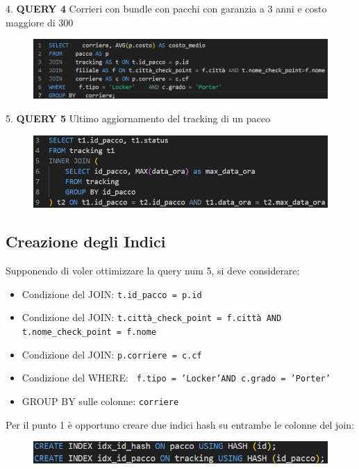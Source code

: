 4. \textbf{QUERY 4} Corrieri con bundle con pacchi con garanzia a 3 anni e costo maggiore di 300
\begin{figure}[H]
\centering
\includegraphics[width=0.8 \textwidth]{Resources/QUERY4.png}
\label{Q4}
\end{figure} 
5. \textbf{QUERY 5} Ultimo aggiornamento del tracking di un pacco
\begin{figure}[H]
\centering
\includegraphics[width=0.8 \textwidth]{Resources/QUERY5.png}
\label{Q5}
\end{figure}

\subsection{Creazione degli Indici} 

Supponendo di voler ottimizzare la query num 5, si deve considerare:

\begin{itemize}
  \item Condizione del JOIN: \texttt{t.id\_pacco = p.id}
  \item Condizione del JOIN: \texttt{t.città\_check\_point = f.città AND t.nome\_check\_point = f.nome}
  \item Condizione del JOIN: \texttt{p.corriere = c.cf}
  \item Condizione del WHERE: \texttt{ f.tipo = 'Locker'AND c.grado = 'Porter'}
  \item GROUP BY sulle colonne: \texttt{corriere}
\end{itemize}


\noindent Per il punto 1 è opportuno creare due indici hash su entrambe le colonne del join:
\begin{figure}[H]
\centering
\includegraphics[width=0.8 \textwidth]{Resources/INDEX1.png}
\label{I1}
\end{figure}

